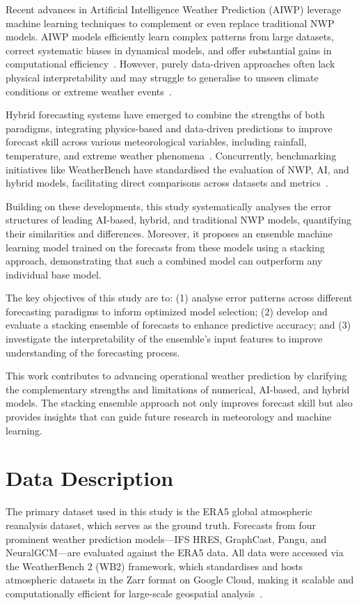 \documentclass{article}
\begin{document}
Recent advances in Artificial Intelligence Weather Prediction (AIWP) leverage machine learning techniques to complement or even replace traditional NWP models. AIWP models efficiently learn complex patterns from large datasets, correct systematic biases in dynamical models, and offer substantial gains in computational efficiency~\cite{kochkov2023neuralgcm, benbouallegue2023hybrid}. However, purely data-driven approaches often lack physical interpretability and may struggle to generalise to unseen climate conditions or extreme weather events~\cite{rasp2024weatherbench2benchmarkgeneration}.

Hybrid forecasting systems have emerged to combine the strengths of both paradigms, integrating physics-based and data-driven predictions to improve forecast skill across various meteorological variables, including rainfall, temperature, and extreme weather phenomena~\cite{kochkov2023neuralgcm}. Concurrently, benchmarking initiatives like WeatherBench have standardised the evaluation of NWP, AI, and hybrid models, facilitating direct comparisons across datasets and metrics~\cite{rasp2024weatherbench2benchmarkgeneration, rasp2020weatherbench}.

Building on these developments, this study systematically analyses the error structures of leading AI-based, hybrid, and traditional NWP models, quantifying their similarities and differences. Moreover, it proposes an ensemble machine learning model trained on the forecasts from these models using a stacking approach, demonstrating that such a combined model can outperform any individual base model.

The key objectives of this study are to: (1) analyse error patterns across different forecasting paradigms to inform optimized model selection; (2) develop and evaluate a stacking ensemble of forecasts to enhance predictive accuracy; and (3) investigate the interpretability of the ensemble’s input features to improve understanding of the forecasting process.

This work contributes to advancing operational weather prediction by clarifying the complementary strengths and limitations of numerical, AI-based, and hybrid models. The stacking ensemble approach not only improves forecast skill but also provides insights that can guide future research in meteorology and machine learning.

\section{Data Description}
The primary dataset used in this study is the ERA5 global atmospheric reanalysis dataset, which serves as the ground truth. Forecasts from four prominent weather prediction models—IFS HRES, GraphCast, Pangu, and NeuralGCM—are evaluated against the ERA5 data. All data were accessed via the WeatherBench 2 (WB2) framework, which standardises and hosts atmospheric datasets in the Zarr format on Google Cloud, making it scalable and computationally efficient for large-scale geospatial analysis~\cite{rasp2020weatherbench,rasp2024weatherbench2benchmarkgeneration}.
\end{document}
